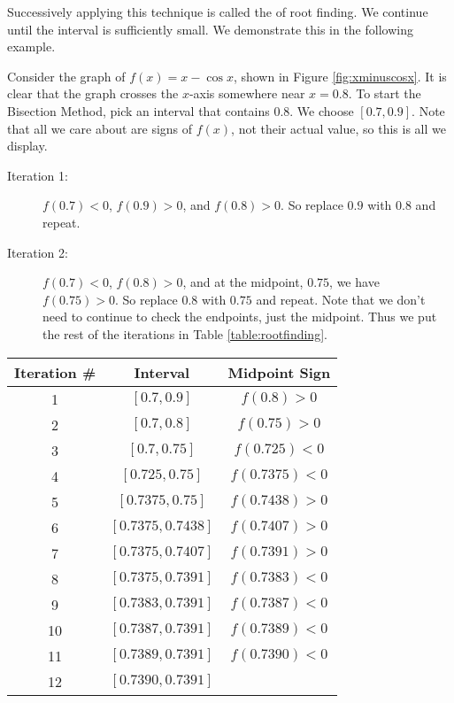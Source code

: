 \enlargethispage{2\baselineskip}	
Successively applying this technique is called the   of root finding. We continue until the interval is sufficiently small. We demonstrate this in the following example.\\

{Consider the graph of $f(x) = x-\cos x$, shown in Figure \ref{fig:xminuscosx}. It is clear that the graph crosses the $x$-axis somewhere near $x=0.8$. To start the Bisection Method, pick an interval that contains $0.8$. We choose $[0.7,0.9]$. Note that all we care about are signs of $f(x)$, not their actual value, so this is all we display.


		\begin{description}
		\item [Iteration 1:] $f(0.7) < 0$, $f(0.9) > 0$, and $f(0.8) >0$. So replace $0.9$ with $0.8$ and repeat.
		\item	[Iteration 2:]	$f(0.7)<0$, $f(0.8) > 0$, and at the midpoint, $0.75$, we have $f(0.75) >0 $. So replace $0.8$ with $0.75$ and repeat. Note that we don't need to continue to check the endpoints, just the midpoint. Thus we put the rest of the iterations in Table \ref{table:rootfinding}.
		\end{description}
		
%
			{\footnotesize\noindent \begin{tabular}{ccc}
			Iteration \# & Interval & Midpoint Sign \\ \hline
			1		& $[0.7,0.9]$ & $f(0.8) >0$ \\
			2 & $[0.7,0.8] $ & $f(0.75) >0$ \\
			3 & $[0.7,0.75]$ & $f(0.725)<0$\\
			4 & $[0.725,0.75]$ & $f(0.7375)<0$\\
			5 & $[0.7375,0.75]$ & $f(0.7438)>0$\\
			6 & $[0.7375,0.7438]$ & $f(0.7407)>0$\\
			7 & $[0.7375,0.7407]$ & $f(0.7391)>0$\\
			8 & $[0.7375,0.7391]$ & $f(0.7383)<0$\\
			9 & $[0.7383,0.7391]$ & $f(0.7387)<0$\\
			10 & $[0.7387,0.7391]$ & $f(0.7389)<0$\\
			11 & $[0.7389,0.7391]$ & $f(0.7390)<0$\\
			12 & $[0.7390,0.7391]$ &   \\
			\end{tabular}
			}%
			
}
